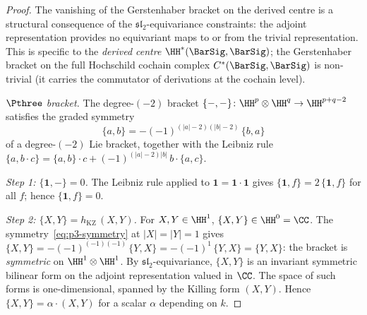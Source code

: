 \begin{proof}
The vanishing of the Gerstenhaber bracket on the derived
centre is a structural consequence of the
$\mathfrak{sl}_2$-equivariance constraints: the adjoint
representation provides no equivariant maps to or from the
trivial representation. This is specific to the
\emph{derived centre} $\HH^*(\BarSig, \BarSig)$; the
Gerstenhaber bracket on the full Hochschild cochain complex
$C^*(\BarSig, \BarSig)$ is non-trivial (it carries the
commutator of derivations at the cochain level).

\textit{$\Pthree$ bracket.}
The degree-$(-2)$ bracket
$\{-,-\}\colon \HH^p \otimes \HH^q \to \HH^{p+q-2}$
satisfies the graded symmetry
\begin{equation}\label{eq:p3-symmetry}
  \{a, b\}
  = -(-1)^{(|a|-2)(|b|-2)}\,\{b, a\}
\end{equation}
of a degree-$(-2)$ Lie bracket, together with the Leibniz rule
$\{a, b \cdot c\}
= \{a, b\} \cdot c + (-1)^{(|a|-2)|b|}\,b \cdot \{a, c\}$.

\textit{Step 1: $\{\mathbf{1}, -\} = 0$.}
The Leibniz rule applied to
$\mathbf{1} = \mathbf{1} \cdot \mathbf{1}$ gives
$\{\mathbf{1}, f\} = 2\,\{\mathbf{1}, f\}$
for all $f$; hence $\{\mathbf{1}, f\} = 0$.

\textit{Step 2: $\{X, Y\} = h_{\mathrm{KZ}}\,(X, Y)$.}
For $X, Y \in \HH^1$,
$\{X, Y\} \in \HH^0 = \CC$.
The symmetry~\eqref{eq:p3-symmetry} at
$|X| = |Y| = 1$ gives
$\{X, Y\} = -(-1)^{(-1)(-1)}\,\{Y, X\}
= -(-1)^1\,\{Y, X\}
= \{Y, X\}$:
the bracket is \emph{symmetric} on $\HH^1 \otimes \HH^1$.
By $\mathfrak{sl}_2$-equivariance, $\{X, Y\}$ is an
invariant symmetric bilinear form on the adjoint
representation valued in $\CC$. The space of such forms is
one-dimensional, spanned by the Killing form $(X, Y)$.
Hence $\{X, Y\} = \alpha \cdot (X, Y)$ for a scalar
$\alpha$ depending on $k$.


\end{proof}
